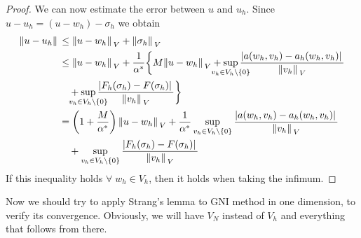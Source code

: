\begin{proof}
    We can now estimate the error between \(u\) and \(u_h\). Since \(u-u_h = (u-w_h) - \sigma_h\) we obtain
    \begin{align*}
        \norm*{u-u_h} &\leq  \norm*{u-w_h}_V + \norm*{\sigma_h}_V \\
        &\leq \norm*{u-w_h}_V + \frac{1}{\alpha^*} \bigg\{M\norm*{u-w_h}_V + \sup_{\mathclap{v_h \in V_h \backslash \left\{0\right\}}} \frac{\abs*{a(w_h, v_h) - a_h(w_h, v_h)}}{\norm*{v_h}_V}  \\
        & \quad + \sup_{\mathclap{v_h \in V_h \backslash \left\{0\right\}}} \frac{\abs*{F_h(\sigma_h)-F(\sigma_h)}}{\norm*{v_h}_V}\bigg\} \\
        &= \left(1+\frac{M}{\alpha^*}\right)\norm*{u-w_h}_V + \frac{1}{\alpha^*} \sup_{v_h \in V_h \backslash \left\{0\right\}} \frac{\abs*{a(w_h, v_h) - a_h(w_h, v_h)}}{\norm*{v_h}_V} \\
        &\quad + \sup_{v_h \in V_h \backslash \left\{0\right\}}\frac{\abs*{F_h(\sigma_h)-F(\sigma_h)}}{\norm*{v_h}_V}
    \end{align*}
    If this inequality holds \(\forall \; w_h \in V_h\), then it holds when taking the infimum.
\end{proof}
Now we should try to apply Strang's lemma to GNI method in one dimension, to verify its convergence. Obviously, we will have \(V_N\) instead of \(V_h\) and everything that follows from there.

